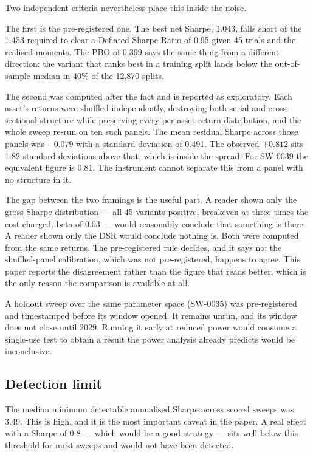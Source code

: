 \documentclass[11pt,a4paper]{article}
\begin{document}
Two independent criteria nevertheless place this inside the noise.

The first is the pre-registered one. The best net Sharpe, 1.043, falls short
of the 1.453 required to clear a Deflated Sharpe Ratio of 0.95 given 45
trials and the realised moments. The PBO of 0.399 says the same thing from a
different direction: the variant that ranks best in a training split lands
below the out-of-sample median in 40\% of the 12{,}870 splits.

The second was computed after the fact and is reported as exploratory. Each
asset's returns were shuffled independently, destroying both serial and
cross-sectional structure while preserving every per-asset return
distribution, and the whole sweep re-run on ten such panels. The mean residual
Sharpe across those panels was $-0.079$ with a standard deviation of 0.491.
The observed $+0.812$ sits 1.82 standard deviations above that, which is
inside the spread. For SW-0039 the equivalent figure is 0.81. The instrument
cannot separate this from a panel with no structure in it.

The gap between the two framings is the useful part. A reader shown only the
gross Sharpe distribution --- all 45 variants positive, breakeven at three
times the cost charged, beta of 0.03 --- would reasonably conclude that
something is there. A reader shown only the DSR would conclude nothing is.
Both were computed from the same returns. The pre-registered rule decides,
and it says no; the shuffled-panel calibration, which was not pre-registered,
happens to agree. This paper reports the disagreement rather than the figure
that reads better, which is the only reason the comparison is available at
all.

A holdout sweep over the same parameter space (SW-0035) was pre-registered
and timestamped before its window opened. It remains unrun, and its window
does not close until 2029. Running it early at reduced power would consume a
single-use test to obtain a result the power analysis already predicts would
be inconclusive.

\subsection{Detection limit}

The median minimum detectable annualised Sharpe across scored sweeps was 3.49.
This is high, and it is the most important caveat in the paper. A real effect
with a Sharpe of 0.8 --- which would be a good strategy --- sits well below
this threshold for most sweeps and would not have been detected.
\end{document}
